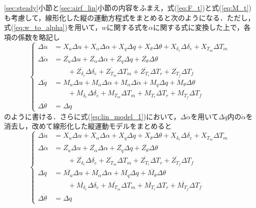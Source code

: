 \ref{sec:steady}小節と\ref{sec:airf_lin}小節の内容をふまえ，式(\ref{eq:F_t})と式(\ref{eq:M_t})も考慮して，線形化した縦の運動方程式をまとめると次のようになる．ただし，式(\ref{eq:w_to_alpha})を用いて，$w$に関する式を$\alpha$に関する式に変換した上で，各項の係数を略記し
\begin{equation}
  \left\{
  \begin{align}
    \Delta \dot{u} &= X_u \Delta u + X_\alpha \Delta \alpha + X_q \Delta q + X_\theta \Delta \theta + X_{\delta_e} \Delta \delta_e + X_{T_m}\Delta T_m \\[3pt]
    \Delta \dot{\alpha} &= \overline{Z_u} \Delta u + \overline{Z_\alpha} \Delta \alpha + \overline{Z_q} \Delta q + \overline{Z_\theta} \Delta \theta \\
    &\qquad+ \overline{Z_{\delta_e}} \Delta \delta_e + \overline{Z_{T_m}}\Delta T_m + \overline{Z_{T_r}}\Delta T_r + \overline{Z_{T_f}}\Delta T_f \\[3pt]
    \Delta \dot{q} &= M_u \Delta u + M_\alpha \Delta \alpha + M_{\dot{\alpha}} \Delta \dot{\alpha} + M_q \Delta q + M_\theta \Delta \theta \\
    &\qquad+ M_{\delta_e} \Delta \delta_e + M_{T_m}\Delta T_m + M_{T_r} \Delta T_r + M_{T_f}\Delta T_f \\[3pt]
    \Delta \dot{\theta} &= \Delta q
  \end{align}
  \label{eq:lin_model_1}
\end{equation}
のように書ける．さらに式(\ref{eq:lin_model_1})において，$\Delta \dot{\alpha}$を用いて$\Delta \dot{q}$内の$\dot{\alpha}$を消去し，改めて線形化した縦運動モデルをまとめると
\begin{equation}
  \left\{
  \begin{align}
    \Delta \dot{u} &= X_u \Delta u + X_\alpha \Delta \alpha + X_q \Delta q + X_\theta \Delta \theta + X_{\delta_e} \Delta \delta_e + X_{T_m}\Delta T_m \\[3pt]
    \Delta \dot{\alpha} &= \overline{Z_u} \Delta u + \overline{Z_\alpha} \Delta \alpha + \overline{Z_q} \Delta q + \overline{Z_\theta} \Delta \theta \\
    &\qquad+ \overline{Z_{\delta_e}} \Delta \delta_e + \overline{Z_{T_m}}\Delta T_m + \overline{Z_{T_r}}\Delta T_r + \overline{Z_{T_f}}\Delta T_f \\[3pt]
    \Delta \dot{q} &= \overline{M_u} \Delta u + \overline{M_\alpha} \Delta \alpha + \overline{M_q} \Delta q + \overline{M_\theta} \Delta \theta \\
    &\qquad+ \overline{M_{\delta_e}} \Delta \delta_e + \overline{M_{T_m}}\Delta T_m + \overline{M_{T_r}} \Delta T_r + \overline{M_{T_f}}\Delta T_f \\[3pt]
    \Delta \dot{\theta} &= \Delta q
  \end{align}
  \label{eq:lin_model}
\end{equation}
